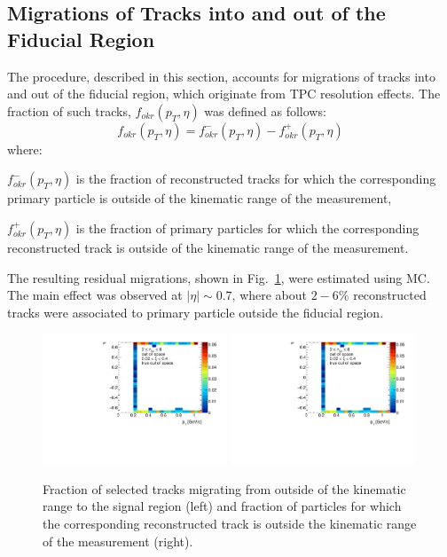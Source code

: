\subsection{Migrations of Tracks into and out of the Fiducial Region}\label{section:star_okr}
The procedure, described in this section, accounts for migrations of tracks into and out of the fiducial region, which originate from TPC resolution effects. The fraction of such tracks, $f_{okr}(p_T, \eta)$ was defined as follows:
\begin{equation}
f_{okr}(p_T, \eta)=f_{okr}^-(p_T, \eta)-f_{okr}^+(p_T, \eta)
\end{equation}
where:
\begin{description}
	\item $f_{okr}^-(p_T, \eta)$ is the fraction of reconstructed tracks for which the corresponding primary particle is outside of the kinematic range of the measurement,
	\item $f_{okr}^+(p_T, \eta)$  is the fraction of primary particles for which the corresponding reconstructed track is outside of the kinematic range of the measurement.
\end{description}
The resulting residual migrations, shown in Fig.~\ref{fig:okr}, were estimated using MC. The main effect  was observed  at $|\eta| \sim 0.7$, where about $2-6\%$ reconstructed tracks were associated to primary particle outside the fiducial region.  

\begin{figure}[h!]
	\centering
	\includegraphics[width=0.49\textwidth, page=1]{chapters/chrgSTAR/img/OKR/outOfSpace.pdf}
	\includegraphics[width=0.49\textwidth, page=2]{chapters/chrgSTAR/img/OKR/outOfSpace.pdf}
	\caption[Fraction of selected tracks migrating from outside of the kinematic range to the signal region and fraction of particles for which the corresponding reconstructed track is outside the kinematic range of the measurement ]{Fraction of selected tracks migrating from outside of the kinematic range to the signal region (left) and fraction of particles for which the corresponding reconstructed track is outside the kinematic range of the measurement (right).}
	\label{fig:okr}
\end{figure}
\FloatBarrier